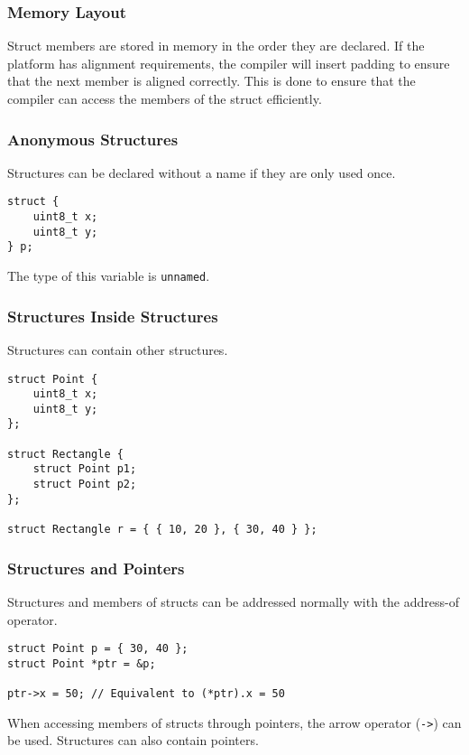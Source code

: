 \documentclass{article}
\begin{document}
\subsubsection{Memory Layout}
Struct members are stored in memory in the order they are declared. If
the platform has alignment requirements, the compiler will insert
padding to ensure that the next member is aligned correctly. This is
done to ensure that the compiler can access the members of the struct
efficiently.
\subsubsection{Anonymous Structures}
Structures can be declared without a name if they are only used once.
\begin{verbatim}
struct {
    uint8_t x;
    uint8_t y;
} p;
\end{verbatim}
The type of this variable is \texttt{unnamed}.
\subsubsection{Structures Inside Structures}
Structures can contain other structures.
\begin{verbatim}
struct Point {
    uint8_t x;
    uint8_t y;
};

struct Rectangle {
    struct Point p1;
    struct Point p2;
};

struct Rectangle r = { { 10, 20 }, { 30, 40 } };
\end{verbatim}
\subsubsection{Structures and Pointers}
Structures and members of structs can be addressed normally with the
address-of operator.
\begin{verbatim}
struct Point p = { 30, 40 };
struct Point *ptr = &p;

ptr->x = 50; // Equivalent to (*ptr).x = 50
\end{verbatim}
When accessing members of structs through pointers, the arrow operator
(\texttt{->}) can be used. Structures can also contain pointers.
\end{document}
